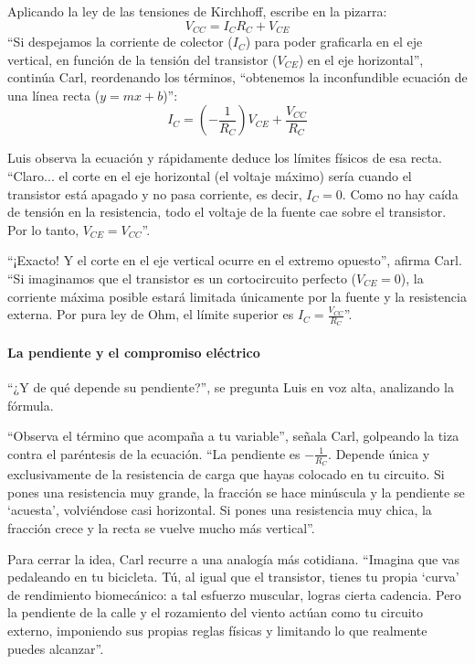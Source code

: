 Aplicando la ley de las tensiones de Kirchhoff, escribe en la pizarra:
\[
V_{CC} = I_C R_C + V_{CE}
\]
``Si despejamos la corriente de colector (\(I_C\)) para poder graficarla en el eje vertical, en función de la tensión del transistor (\(V_{CE}\)) en el eje horizontal'', continúa Carl, reordenando los términos, ``obtenemos la inconfundible ecuación de una línea recta (\(y = m x + b\))'':
\[
I_C = \left(-\frac{1}{R_C}\right) V_{CE} + \frac{V_{CC}}{R_C}
\]

Luis observa la ecuación y rápidamente deduce los límites físicos de esa recta. ``Claro... el corte en el eje horizontal (el voltaje máximo) sería cuando el transistor está apagado y no pasa corriente, es decir, \(I_C = 0\). Como no hay caída de tensión en la resistencia, todo el voltaje de la fuente cae sobre el transistor. Por lo tanto, \(V_{CE} = V_{CC}\)''.

``¡Exacto! Y el corte en el eje vertical ocurre en el extremo opuesto'', afirma Carl. ``Si imaginamos que el transistor es un cortocircuito perfecto (\(V_{CE} = 0\)), la corriente máxima posible estará limitada únicamente por la fuente y la resistencia externa. Por pura ley de Ohm, el límite superior es \(I_C = \frac{V_{CC}}{R_C}\)''.

\paragraph{La pendiente y el compromiso eléctrico}
``¿Y de qué depende su pendiente?'', se pregunta Luis en voz alta, analizando la fórmula.
    
``Observa el término que acompaña a tu variable'', señala Carl, golpeando la tiza contra el paréntesis de la ecuación. ``La pendiente es \(-\frac{1}{R_C}\). Depende única y exclusivamente de la resistencia de carga que hayas colocado en tu circuito. Si pones una resistencia muy grande, la fracción se hace minúscula y la pendiente se `acuesta', volviéndose casi horizontal. Si pones una resistencia muy chica, la fracción crece y la recta se vuelve mucho más vertical''.

Para cerrar la idea, Carl recurre a una analogía más cotidiana. ``Imagina que vas pedaleando en tu bicicleta. Tú, al igual que el transistor, tienes tu propia `curva' de rendimiento biomecánico: a tal esfuerzo muscular, logras cierta cadencia. Pero la pendiente de la calle y el rozamiento del viento actúan como tu circuito externo, imponiendo sus propias reglas físicas y limitando lo que realmente puedes alcanzar''. 

